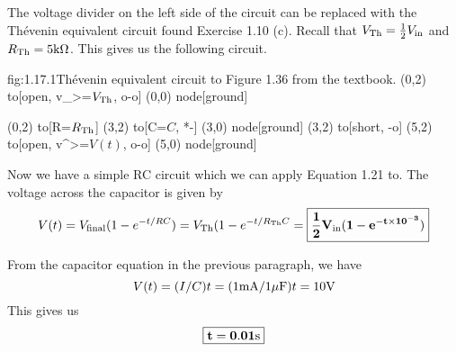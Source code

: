 \documentclass{article}
\begin{document}
    The voltage divider on the left side of the circuit can be replaced with the Th\'evenin equivalent circuit found Exercise 1.10 (c). Recall that $V_{\text{Th}} = \frac{1}{2} V_{\text{in}}$ and $R_{\text{Th}} = 5\text{k}\Omega$. This gives us the following circuit.
    \begin{circuit}{fig:1.17.1}{Th\'evenin equivalent circuit to Figure 1.36 from the textbook.}
        (0,2) to[open, v_>=$V_{\text{Th}}$, o-o] (0,0) node[ground]{}
        
        (0,2) to[R=$R_{\text{Th}}$] (3,2)
            to[C=$C$, *-] (3,0) node[ground]{}
        (3,2) to[short, -o] (5,2)
        to[open, v^>=$V(t)$, o-o] (5,0) node[ground]{}
    \end{circuit}

    Now we have a simple RC circuit which we can apply Equation 1.21 to. The voltage across the capacitor is given by 
    \[V(t) = V_\text{final}(1 - e^{-t/RC}) = V_{\text{Th}} (1 - e^{-t/R_{\text{Th}} C} = \boxed{\mathbf{\frac{1}{2}V_{\text{in}} (1 - e^{-t\times 10^{-3}})}}\]


    From the capacitor equation in the previous paragraph, we have 
    \[V(t) = (I/C)t = (1 \text{m}\text{A}/1\mu\text{F})t = 10\text{V}\]
    This gives us
    \[\boxed{\mathbf{t = 0.01\text{s}}}\]
\end{document}
